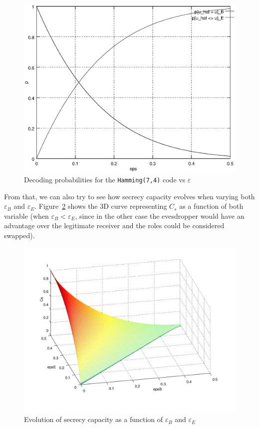 \documentclass[a4paper,12pt,titlepage]{article}
\begin{document}
\begin{figure}[h]
  \centering
  \includegraphics[scale=0.8]{bsc_decoding_probs.eps}
  \caption{Decoding probabilities for the \texttt{Hamming(7,4)} code vs
  $\varepsilon$}
  \label{fig:decode_probs}
\end{figure}

From that, we can also try to see how secrecy capacity evolves when varying
both $\varepsilon_B$ and $\varepsilon_E$. Figure~\ref{fig:bsc_mesh_cs} shows
the 3D curve representing $C_s$ as a function of both variable (when
$\varepsilon_B < \varepsilon_E$, since in the other case the evesdropper would
have an advantage over the legitimate receiver and the roles could be
considered swapped).

\begin{figure}[p]
  \centering
  \includegraphics[scale=0.8]{bsc_mesh_cs.jpg}
  \caption{Evolution of secrecy capacity as a function of
  $\varepsilon_B$ and $\varepsilon_E$}
  \label{fig:bsc_mesh_cs}
\end{figure}
\end{document}
